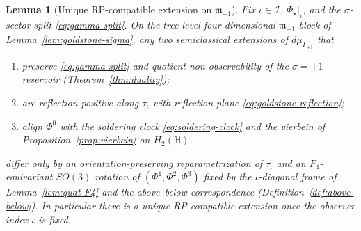 \documentclass[aps,prd,onecolumn,amsmath,amssymb,nofootinbib,11pt]{revtex4-2}
\numberwithin{equation}{section}
\theoremstyle{plain}
\newtheorem{lemma}[theorem]{Lemma}
\theoremstyle{definition}
\theoremstyle{remark}
\newcommand{\Quat}{\mathbb{H}}
\newcommand{\orderparam}{\Phi}
\begin{document}
\begin{lemma}[Unique RP-compatible extension on $\mathfrak{m}_{+1}$]
\label{lem:goldstone-rp-unique}
Fix $\iota\in\mathcal{I}$, $\orderparam_\star|_\iota$, and the
$\sigma$-sector split \eqref{eq:gamma-split}. On the tree-level
four-dimensional $\mathfrak{m}_{+1}$ block of
Lemma~\ref{lem:goldstone-sigma}, any two semiclassical extensions of
$d\mu_{\Gamma_{+1}}$ that
\begin{enumerate}[label=(\roman*),leftmargin=*]
  \item preserve \eqref{eq:gamma-split} and quotient-non-observability of
    the $\sigma=+1$ reservoir (Theorem~\ref{thm:duality});
  \item are reflection-positive along $\tau_\iota$ with reflection plane
    \eqref{eq:goldstone-reflection};
  \item align $\orderparam^0$ with the soldering clock
    \eqref{eq:soldering-clock} and the vierbein of
    Proposition~\ref{prop:vierbein} on $H_2(\Quat)$.
\end{enumerate}
differ only by an orientation-preserving reparametrization of
$\tau_\iota$ and an $F_4$-equivariant $SO(3)$ rotation of
$(\orderparam^1,\orderparam^2,\orderparam^3)$ fixed by the
$\iota$-diagonal frame of Lemma~\ref{lem:quat-F4} and the above--below
correspondence (Definition~\ref{def:above-below}). In particular there is a
\emph{unique} RP-compatible extension once the observer index $\iota$ is fixed.
\end{lemma}
\end{document}
